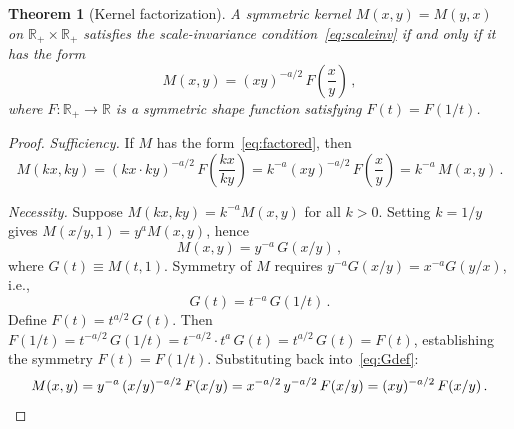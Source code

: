\documentclass[10pt,a4paper]{amsart}
\newtheorem{theorem}{Theorem}
\begin{document}
\begin{theorem}[Kernel factorization]\label{thm:factorization}
A symmetric kernel $M(x,y) = M(y,x)$ on $\mathbb{R}_+ \times \mathbb{R}_+$ satisfies the scale-invariance condition~\eqref{eq:scaleinv} if and only if it has the form
\begin{equation}\label{eq:factored}
M(x,y) = (xy)^{-a/2}\, F\!\left(\frac{x}{y}\right)\,,
\end{equation}
where $F: \mathbb{R}_+ \to \mathbb{R}$ is a symmetric shape function satisfying $F(t) = F(1/t)$.
\end{theorem}

\begin{proof}
\emph{Sufficiency.} If $M$ has the form~\eqref{eq:factored}, then
\[
M(kx,ky) = (kx \cdot ky)^{-a/2}\, F\!\left(\frac{kx}{ky}\right) = k^{-a}(xy)^{-a/2}\, F\!\left(\frac{x}{y}\right) = k^{-a}\, M(x,y)\,.
\]

\emph{Necessity.} Suppose $M(kx,ky) = k^{-a} M(x,y)$ for all $k > 0$. Setting $k = 1/y$ gives $M(x/y, 1) = y^a M(x,y)$, hence
\begin{equation}\label{eq:Gdef}
M(x,y) = y^{-a}\, G(x/y)\,,
\end{equation}
where $G(t) \equiv M(t,1)$. Symmetry of $M$ requires $y^{-a} G(x/y) = x^{-a} G(y/x)$, i.e.,
\begin{equation}\label{eq:Gsym}
G(t) = t^{-a}\, G(1/t)\,.
\end{equation}
Define $F(t) = t^{a/2}\, G(t)$. Then $F(1/t) = t^{-a/2}\, G(1/t) = t^{-a/2} \cdot t^a \, G(t) = t^{a/2}\, G(t) = F(t)$, establishing the symmetry $F(t) = F(1/t)$. Substituting back into~\eqref{eq:Gdef}:
\[
M(x,y) = y^{-a}\, (x/y)^{-a/2}\, F(x/y) = x^{-a/2}\, y^{-a/2}\, F(x/y) = (xy)^{-a/2}\, F(x/y)\,. \qedhere
\]
\end{proof}
\end{document}

